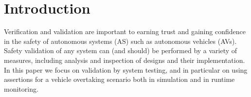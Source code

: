 

\section{Introduction}

Verification and validation are important to earning trust and gaining confidence in the safety of autonomous systems (AS) such as autonomous vehicles (AVs). Safety validation of any system can (and should) be performed by a variety of measures, including analysis and inspection of designs and their implementation. In this paper we focus on validation by system testing, and in particular on using assertions for a vehicle overtaking scenario  both in simulation and in runtime monitoring. 
%

